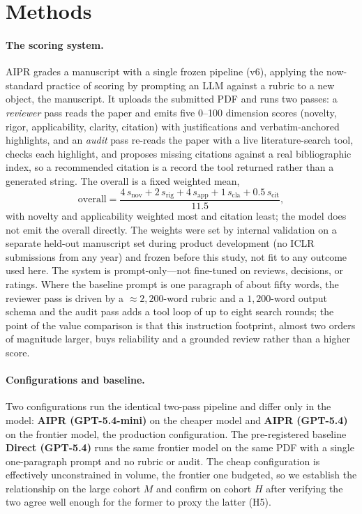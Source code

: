 \section{Methods}
\label{sec:nmi-methods}
\label{sec:methods}

\paragraph{The scoring system.}
\textsc{AIPR} grades a manuscript with a single frozen pipeline (v6), applying the now-standard
practice of scoring by prompting an LLM against a rubric \citep{liu2023geval,zheng2023judging} to
a new object, the manuscript. It uploads the submitted PDF and runs two passes: a \emph{reviewer}
pass reads the paper and emits five 0--100 dimension scores (novelty, rigor, applicability,
clarity, citation) with justifications and verbatim-anchored highlights, and an \emph{audit} pass
re-reads the paper with a live literature-search tool, checks each highlight, and proposes missing
citations against a real bibliographic index, so a recommended citation is a record the tool
returned rather than a generated string. The overall is a fixed weighted mean,
\begin{equation}
  \text{overall} = \frac{4\,s_{\text{nov}} + 2\,s_{\text{rig}} + 4\,s_{\text{app}}
  + 1\,s_{\text{cla}} + 0.5\,s_{\text{cit}}}{11.5},
  \label{eq:overall}
\end{equation}
with novelty and applicability weighted most and citation least; the model does not emit the
overall directly. The weights were set by internal validation on a separate held-out manuscript
set during product development (no ICLR submissions from any year) and frozen before this study,
not fit to any outcome used here. The system is prompt-only---not fine-tuned on reviews, decisions,
or ratings. Where the baseline prompt is one paragraph of about fifty words, the reviewer pass is
driven by a ${\approx}2{,}200$-word rubric and a $1{,}200$-word output schema and the audit pass
adds a tool loop of up to eight search rounds; the point of the value comparison is that this
instruction footprint, almost two orders of magnitude larger, buys reliability and a grounded
review rather than a higher score.

\paragraph{Configurations and baseline.}
Two configurations run the identical two-pass pipeline and differ only in the model:
\textbf{AIPR (GPT-5.4-mini)} on the cheaper model and \textbf{AIPR (GPT-5.4)} on the frontier
model, the production configuration. The pre-registered baseline \textbf{Direct (GPT-5.4)} runs
the same frontier model on the same PDF with a single one-paragraph prompt and no rubric or audit.
The cheap configuration is effectively unconstrained in volume, the frontier one budgeted, so we
establish the relationship on the large cohort $M$ and confirm on cohort $H$ after verifying the
two agree well enough for the former to proxy the latter (H5).

